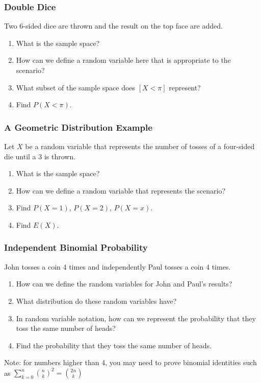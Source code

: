 \documentclass{beamer}
\begin{document}


\begin{frame}
  \frametitle{Double Dice}
  Two 6-sided dice are thrown and the result on the top face are added.
  \begin{enumerate}
    \item What is the sample space?
    \item How can we define a random variable here that is appropriate to the scenario?
    \item What subset of the sample space does $[X < \pi]$ represent?
    \item Find $P(X < \pi)$.
  \end{enumerate}
\end{frame}

\begin{frame}
  \frametitle{A Geometric Distribution Example}
  Let $X$ be a random variable that represents the number of tosses of a four-sided die until a 3 is thrown.
  \begin{enumerate}
    \item What is the sample space?
    \item How can we define a random variable that represents the scenario?
    \item Find $P(X = 1)$, $P(X=2)$, $P(X=x)$.
    \item Find $E(X)$.
  \end{enumerate}
\end{frame}

\begin{frame}
  \frametitle{Independent Binomial Probability}
  John tosses a coin 4 times and independently Paul tosses a coin 4 times.
  \begin{enumerate}
    \item How can we define the random variables for John and Paul's results?
    \item What distribution do these random variables have?
    \item In random variable notation, how can we represent the probability that they toss the same number of heads?
    \item Find the probability that they toss the same number of heads.
  \end{enumerate}
  Note: for numbers higher than 4, you may need to prove binomial identities such as $\sum_{k=0}^n \binom{n}{k}^2 = \binom{2n}{k}$
\end{frame}
\end{document}
